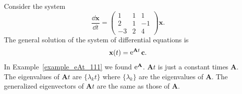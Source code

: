 \begin{Example}
  Consider the system
  \[
  \frac{\dd \mathbf{x}}{\dd t} = 
  \begin{pmatrix}
    1 & 1 & 1 \\
    2 & 1 & -1 \\
    -3 & 2 & 4 
  \end{pmatrix}
  \mathbf{x}.
  \]
  The general solution of the system of differential equations is
  \[
  \mathbf{x}(t) = \mathop{\mathrm{e}}\nolimits^{\mathbf{A} t} \mathbf{c}.
  \]
  In Example~\ref{example_eAt_111} we found $\mathop{\mathrm{e}}\nolimits^{\mathbf{A}}$.  $\mathbf{A} t$ is just
  a constant times $\mathbf{A}$. The eigenvalues
  of $\mathbf{A} t$ are $\{\lambda_k t\}$ where $\{\lambda_k\}$ are the 
  eigenvalues of $\mathbf{A}$.  The generalized eigenvectors of $\mathbf{A} t$ are the
  same as those of $\mathbf{A}$.  


\end{Example}
